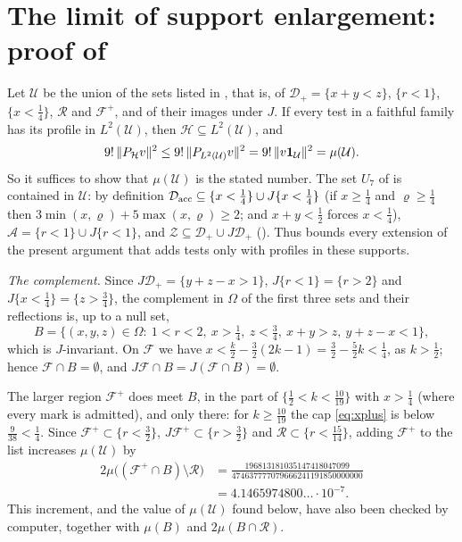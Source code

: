 \documentclass[11pt,colorlinks]{charlie}
\newcommand{\Om}{\Omega}
\begin{document}
\section{The limit of support enlargement: proof of }\label{sec:ceiling}

Let $\mathcal U$ be the union of the sets listed in , that is, of $\mathcal D_+=\{x+y<z\}$, $\{r<1\}$, $\{x<\frac14\}$, $\mathcal R$ and $\mathcal F^+$, and of their images under $J$. If every test in a faithful family has its profile in $L^2(\mathcal U)$, then $\mathcal H\subseteq L^2(\mathcal U)$, and
\[
 9!\,\|P_{\mathcal H}v\|^2\le9!\,\|P_{L^2(\mathcal U)}v\|^2=9!\,\|v\mathbf{1}_{\mathcal U}\|^2=\mu(\mathcal U).
\]
So it suffices to show that $\mu(\mathcal U)$ is the stated number. The set $U_7$ of  is contained in $\mathcal U$: by definition $\mathcal D_{\rm acc}\subseteq\{x<\frac14\}\cup J\{x<\frac14\}$ (if $x\ge\frac14$ and $\varrho\ge\frac14$ then $3\min(x,\varrho)+5\max(x,\varrho)\ge2$; and $x+y<\frac12$ forces $x<\frac14$), $\mathcal A=\{r<1\}\cup J\{r<1\}$, and $\mathcal Z\subseteq\mathcal D_+\cup J\mathcal D_+$ (). Thus  bounds every extension of the present argument that adds tests only with profiles in these supports.

\emph{The complement.} Since $J\mathcal D_+=\{y+z-x>1\}$, $J\{r<1\}=\{r>2\}$ and $J\{x<\frac14\}=\{z>\frac34\}$, the complement in $\Om$ of the first three sets and their reflections is, up to a null set,
\[
 B=\{(x,y,z)\in\Om:\ 1<r<2,\ x>\tfrac14,\ z<\tfrac34,\ x+y>z,\ y+z-x<1\},
\]
which is $J$-invariant. On $\mathcal F$ we have $x<\frac k2-\frac32(2k-1)=\frac32-\frac52k<\frac14$, as $k>\frac12$; hence $\mathcal F\cap B=\emptyset$, and $J\mathcal F\cap B=J(\mathcal F\cap B)=\emptyset$.

The larger region $\mathcal F^+$ does meet $B$, in the part of $\{\frac12<k<\frac{10}{19}\}$ with $x>\frac14$ (where every mark is admitted), and only there: for $k\ge\frac{10}{19}$ the cap \eqref{eq:xplus} is below $\frac9{38}<\frac14$. Since $\mathcal F^+\subset\{r<\frac32\}$, $J\mathcal F^+\subset\{r>\frac32\}$ and $\mathcal R\subset\{r<\frac{15}{14}\}$, adding $\mathcal F^+$ to the list increases $\mu(\mathcal U)$ by
\[
 \begin{split}
 2\mu\big((\mathcal F^+\cap B)\setminus\mathcal R\big)&=\frac{196813181035147418047099}{474637777079666241191850000000}\\
 &=4.1465974800\ldots\cdot10^{-7}.
 \end{split}
\]
This increment, and the value of $\mu(\mathcal U)$ found below, have also been checked by computer, together with $\mu(B)$ and $2\mu(B\cap\mathcal R)$.
\end{document}
